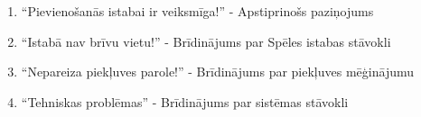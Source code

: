 {
	\begin{enumerate}
		\item ``Pievienošanās istabai ir veiksmīga!'' - Apstiprinošs paziņojums
		\item ``Istabā nav brīvu vietu!'' - Brīdinājums par Spēles istabas stāvokli
		\item ``Nepareiza piekļuves parole!'' - Brīdinājums par piekļuves mēģinājumu
		\item ``Tehniskas problēmas'' - Brīdinājums par sistēmas stāvokli
	\end{enumerate}
}
